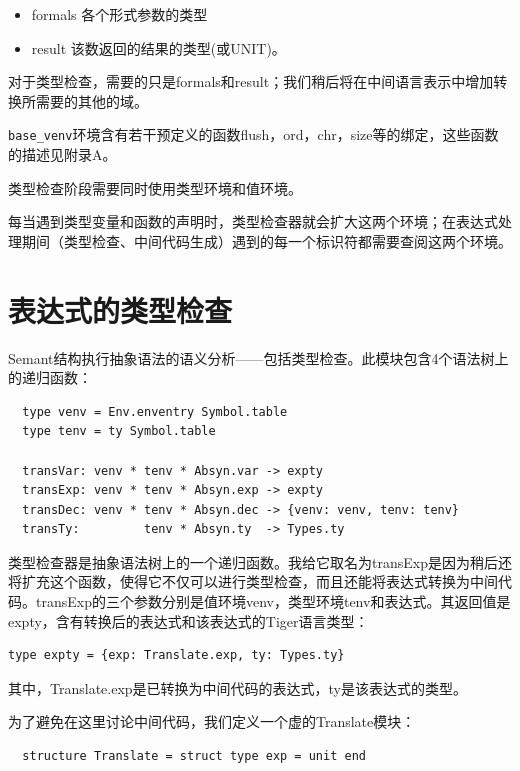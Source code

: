\documentclass[cn,11pt,chinese]{elegantbook}
\begin{document}
\begin{itemize}
  \item formals 各个形式参数的类型
  \item result 该数返回的结果的类型(或UNIT)。
\end{itemize}

对于类型检查，需要的只是formals和result；我们稍后将在中间语言表示中增加转换所需要的其他的域。

\lstinline{base_venv}环境含有若干预定义的函数flush，ord，chr，size等的绑定，这些函数的描述见附录A。

类型检查阶段需要同时使用类型环境和值环境。

每当遇到类型变量和函数的声明时，类型检查器就会扩大这两个环境；在表达式处理期间（类型检查、中间代码生成）遇到的每一个标识符都需要查阅这两个环境。

\section{表达式的类型检查}

Semant结构执行抽象语法的语义分析——包括类型检查。此模块包含4个语法树上的递归函数：

\begin{lstlisting}
  type venv = Env.enventry Symbol.table
  type tenv = ty Symbol.table

  transVar: venv * tenv * Absyn.var -> expty
  transExp: venv * tenv * Absyn.exp -> expty
  transDec: venv * tenv * Absyn.dec -> {venv: venv, tenv: tenv}
  transTy:         tenv * Absyn.ty  -> Types.ty
\end{lstlisting}

类型检查器是抽象语法树上的一个递归函数。我给它取名为transExp是因为稍后还将扩充这个函数，使得它不仅可以进行类型检查，而且还能将表达式转换为中间代码。transExp的三个参数分别是值环境venv，类型环境tenv和表达式。其返回值是expty，含有转换后的表达式和该表达式的Tiger语言类型：

\begin{lstlisting}
type expty = {exp: Translate.exp, ty: Types.ty}
\end{lstlisting}

其中，Translate.exp是已转换为中间代码的表达式，ty是该表达式的类型。

为了避免在这里讨论中间代码，我们定义一个虚的Translate模块：

\begin{lstlisting}
  structure Translate = struct type exp = unit end
\end{lstlisting}
\end{document}
